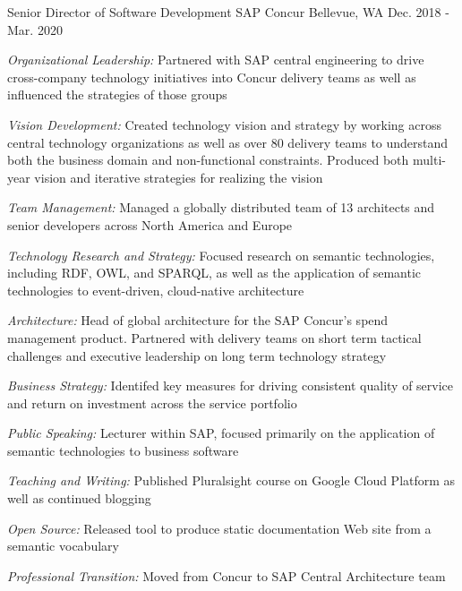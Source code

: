 \begin{cventries}
\cventry
{Senior Director of Software Development} %
{SAP Concur} %
{Bellevue, WA} %
{Dec. 2018 - Mar. 2020} %
{ %
\begin{cvitems}
\item {\emph{Organizational Leadership:} Partnered with SAP central engineering to drive cross-company technology initiatives into Concur delivery teams as well as influenced the strategies of those groups }
\item {\emph{Vision Development:} Created technology vision and strategy by working across central technology organizations as well as over 80 delivery teams to understand both the business domain and non-functional constraints. Produced both multi-year vision and iterative strategies for realizing the vision }
\item {\emph{Team Management:} Managed a globally distributed team of 13 architects and senior developers across North America and Europe }
\item {\emph{Technology Research and Strategy:} Focused research on semantic technologies, including RDF, OWL, and SPARQL, as well as the application of semantic technologies to event-driven, cloud-native architecture }
\item {\emph{Architecture:} Head of global architecture for the SAP Concur’s spend management product. Partnered with delivery teams on short term tactical challenges and executive leadership on long term technology strategy }
\item {\emph{Business Strategy:} Identifed key measures for driving consistent quality of service and return on investment across the service portfolio }
\item {\emph{Public Speaking:} Lecturer within SAP, focused primarily on the application of semantic technologies to business software }
\item {\emph{Teaching and Writing:} Published Pluralsight course on Google Cloud Platform as well as continued blogging }
\item {\emph{Open Source:} Released tool to produce static documentation Web site from a semantic vocabulary }
\item {\emph{Professional Transition:} Moved from Concur to SAP Central Architecture team }
\end{cvitems}
}



\end{cventries}
